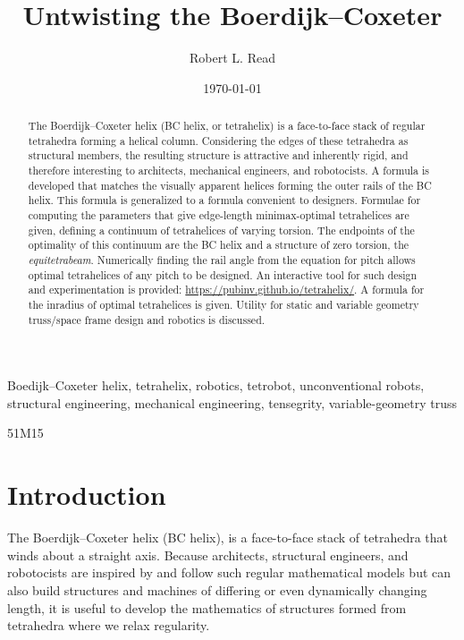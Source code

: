 \documentclass[review]{siamonline1116}
\title{Untwisting the Boerdijk--Coxeter}
\author{Robert L. Read \email{read.robert@gmail.com}
}
\date{\today}
\begin{document}
\maketitle


\begin{abstract}
  The Boerdijk--Coxeter helix (BC helix, or tetrahelix) is a
  face-to-face stack of regular tetrahedra forming a helical column.  Considering the edges of
  these tetrahedra as structural members, the resulting structure is attractive and
  inherently rigid, and therefore interesting to architects,
  mechanical engineers, and robotocists.  A formula is developed that matches the
  visually apparent helices forming the outer rails of the BC helix.
  This formula is generalized to a formula convenient to designers.
  Formulae for 
  computing the
  parameters that give edge-length minimax-optimal tetrahelices
  are given, defining a continuum of tetrahelices of varying torsion.
  The endpoints of the optimality of this continuum are the BC helix and
  a structure of zero torsion, the \emph{equitetrabeam}.
  Numerically finding the rail angle from the equation for
  pitch allows optimal tetrahelices of any pitch to be designed. 
  An interactive tool for such design and experimentation is provided: \url{https://pubinv.github.io/tetrahelix/}.
  A formula for the inradius of optimal tetrahelices is given.
  Utility for static and variable geometry
  truss/space frame design and robotics is discussed.
\end{abstract}

\begin{keywords}
  Boedijk--Coxeter helix, tetrahelix, robotics, tetrobot, unconventional robots,
  structural engineering, mechanical engineering, tensegrity, variable-geometry truss
\end{keywords}
\begin{AMS}
  51M15
\end{AMS}

\section{Introduction}

The Boerdijk--Coxeter helix\cite{coxeter1985simplicial} (BC helix), is
a face-to-face stack of tetrahedra that winds about a straight axis.
Because architects, structural engineers, and robotocists are inspired
by and follow such regular mathematical models but can also build structures and
machines of differing or even dynamically changing length, it is
useful to develop the mathematics of structures formed from tetrahedra
where we relax regularity.
\end{document}
